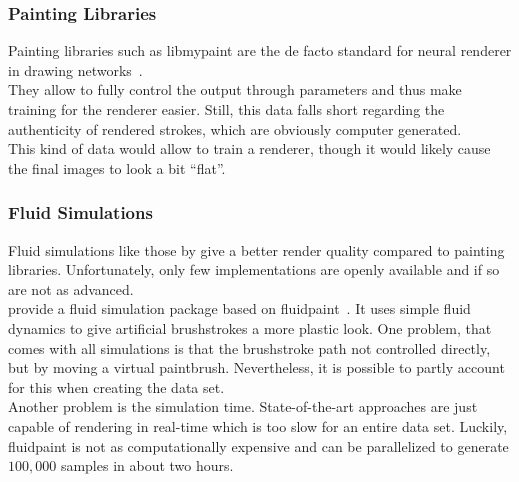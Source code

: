 \subsubsection{Painting Libraries}
Painting libraries such as libmypaint are the de facto standard for neural renderer in drawing networks~\cite{neuralpainters, learning2paint, strokenet}.\\
They allow to fully control the output through parameters and thus make training for the renderer easier.
Still, this data falls short regarding the authenticity of rendered strokes, which are obviously computer generated.\\
This kind of data would allow to train a renderer, though it would likely cause the final images to look a bit ``flat''.

\subsubsection{Fluid Simulations}
Fluid simulations like those by \citeauthor*{wetbrush} give a better render quality compared to painting libraries. 
Unfortunately, only few implementations are openly available and if so are not as advanced.\\
\citeauthor*{SPIRAL} provide a fluid simulation package based on fluidpaint~\cite{fluidpaint}.
It uses simple fluid dynamics to give artificial brushstrokes a more plastic look.
One problem, that comes with all simulations is that the brushstroke path not controlled directly, but by moving a virtual paintbrush.
Nevertheless, it is possible to partly account for this when creating the data set.\\
Another problem is the simulation time.
State-of-the-art approaches are just capable of rendering in real-time which is too slow for an entire data set.
Luckily, fluidpaint is not as computationally expensive and can be parallelized to generate $100,000$ samples in about two hours.

